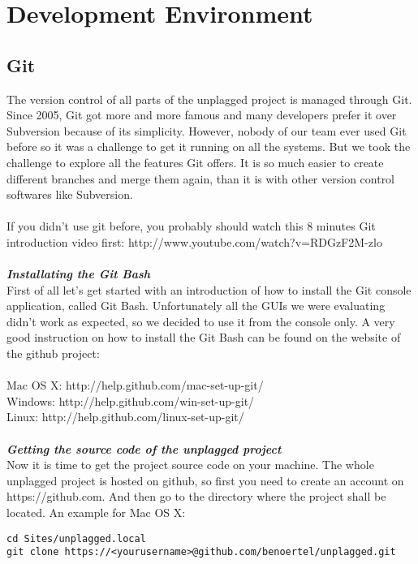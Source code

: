 \section{Development Environment}

\subsection{Git}
The version control of all parts of the unplagged project is managed through Git. Since 2005, Git got more and more famous and many developers prefer it over Subversion because of its simplicity. However, nobody of our team ever used Git before so it was a challenge to get it running on all the systems. But we took the challenge to explore all the features Git offers. It is so much easier to create different branches and merge them again, than it is with other version control softwares like Subversion.\\
\\
If you didn't use git before, you probably should watch this 8 minutes Git introduction video first:
http://www.youtube.com/watch?v=RDGzF2M-zlo\\
\\
\textbf{\textit{Installating the Git Bash}}
\\
First of all let's get started with an introduction of how to install the Git console application, called Git Bash. 
Unfortunately all the GUIs we were evaluating didn't work as expected, so we decided to use it from the console only. 
A very good instruction on how to install the Git Bash can be found on the website of the github project:
\\
\\
Mac OS X: http://help.github.com/mac-set-up-git/
\\
Windows: http://help.github.com/win-set-up-git/
\\
Linux: http://help.github.com/linux-set-up-git/
\\
\\
\textbf{\textit{Getting the source code of the unplagged project}}
\\
Now it is time to get the project source code on your machine. The whole unplagged project is hosted on github, so first you need to create an account on https://github.com. And then go to the directory where the project shall be located. An example for Mac OS X:

\begin{verbatim}
cd Sites/unplagged.local
git clone https://<yourusername>@github.com/benoertel/unplagged.git
\end{verbatim}

